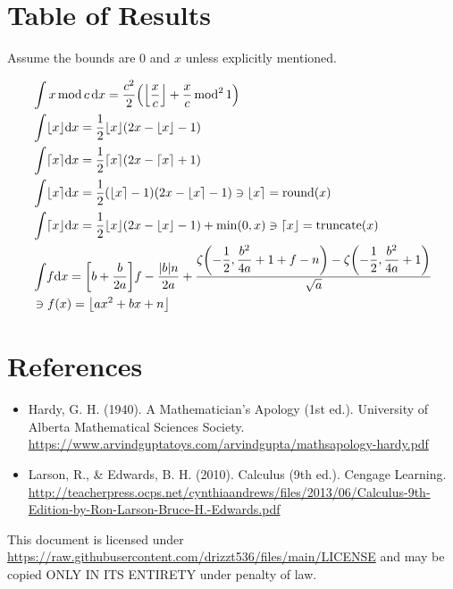\documentclass[12pt]{article}
\begin{document}
{}
\section*{Table of Results}

	\indent\indent Assume the bounds are $0$ and $x$ unless explicitly mentioned.

	\begin{minipage}{\textwidth}
		\centering
		\begin{align}
			& \int x\,\text{mod}\,c\, \text dx = \dfrac{c^2}2\!\left(\left\lfloor\dfrac xc\right
												\rfloor+\dfrac xc\,\text{mod}^2\,1\right)\\
			& \int \lfloor x\rfloor   \text dx = \dfrac12\lfloor x\rfloor(2x-\lfloor x\rfloor-1)\\
			& \int \lceil x\rceil     \text dx = \dfrac12\lceil x\rceil(2x-\lceil x\rceil+1)\\
			& \int \lfloor x\rceil    \text dx = \dfrac12(\lfloor x\rceil-1)(2x-\lfloor x\rceil-1)
												\ni\lfloor x\rceil=\text{round}(x)\\
			& \int \lceil x\rfloor    \text dx = \dfrac12\lfloor x\rfloor(2x-\lfloor x\rfloor-1)+
												\min(0,x)\ni\lceil x\rfloor=\text{truncate}(x)\\
			& \int \!f                \text dx = \left[b+\dfrac b{2a}\right]\!f-\dfrac{|b|n}{2a}
												+\dfrac{\zeta\!\left(-\dfrac12,\dfrac{b^2}{4a}+1
												+f-n\right)-\zeta\!\left(-\dfrac12,\dfrac{b^2}{4a}
												+1\right)}{\sqrt a}\\
			& \ni f(x)=\left\lfloor ax^2+bx+n\right\rfloor \notag
		\end{align}
	\end{minipage}

{}
\section*{References}

	\begin{itemize}
		\item Hardy, G. H. (1940). A Mathematician's Apology (1st ed.). University of Alberta
			Mathematical Sciences Society.\\
			\url{https://www.arvindguptatoys.com/arvindgupta/mathsapology-hardy.pdf}\\

		\item Larson, R., \& Edwards, B. H. (2010). Calculus (9th ed.). Cengage Learning.\\
			\url{http://teacherpress.ocps.net/cynthiaandrews/files/2013/06/Calculus-9th-Edition-by-Ron-Larson-Bruce-H.-Edwards.pdf}
	\end{itemize}
	\vfill
	This document is licensed under \url{https://raw.githubusercontent.com/drizzt536/files/main/LICENSE}
	and may be copied ONLY IN ITS ENTIRETY under penalty of law.\\
	\vspace{0.5em}
\end{document}
